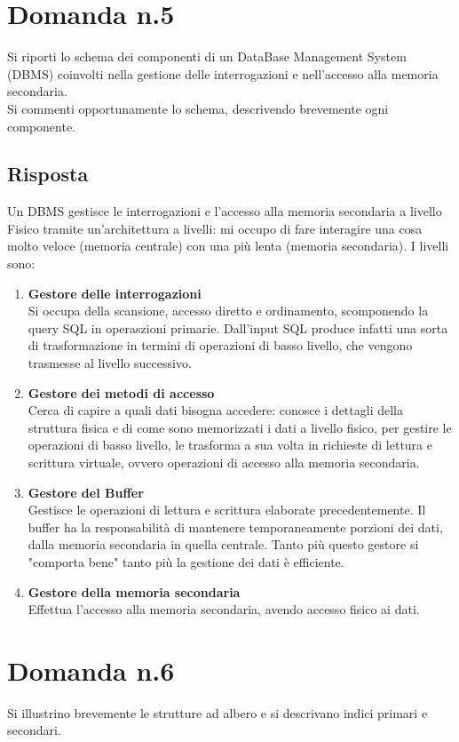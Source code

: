 \documentclass{article}
\begin{document}
\section*{Domanda n.5}
Si riporti lo schema dei componenti di un DataBase Management System (DBMS) coinvolti nella gestione delle
interrogazioni e nell'accesso alla memoria secondaria.\\
Si commenti opportunamente lo schema, descrivendo brevemente ogni componente.
\subsection*{Risposta}
Un DBMS gestisce le interrogazioni e l'accesso alla memoria secondaria a livello Fisico tramite un'architettura a livelli: mi occupo di fare interagire una cosa molto veloce (memoria centrale)
con una più lenta (memoria secondaria). I livelli sono:
\begin{enumerate}
    \item \textbf{Gestore delle interrogazioni}\\Si occupa della scansione, accesso diretto e ordinamento, scomponendo la query SQL in operaszioni primarie. Dall'input SQL produce infatti una sorta di trasformazione in termini di operazioni di basso livello, che vengono
    trasmesse al livello successivo.
    \item \textbf{Gestore dei metodi di accesso}\\Cerca di capire a quali dati bisogna accedere: conosce i dettagli della struttura fisica e di come sono memorizzati i dati a livello fisico, per gestire le operazioni di basso livello, le trasforma a sua volta in richieste di 
    lettura e scrittura virtuale, ovvero operazioni di accesso alla memoria secondaria.
    \item \textbf{Gestore del Buffer}\\Gestisce le operazioni di lettura e scrittura elaborate precedentemente. Il buffer ha la responsabilità di mantenere temporaneamente porzioni dei dati, dalla memoria secondaria in quella centrale. Tanto più questo gestore si "comporta bene" tanto più la gestione
    dei dati è efficiente.
    \item \textbf{Gestore della memoria secondaria}\\Effettua l'accesso alla memoria secondaria, avendo accesso fisico ai dati.
\end{enumerate}

\section*{Domanda n.6}
Si illustrino brevemente le strutture ad albero e si descrivano indici primari e secondari.
\end{document}

